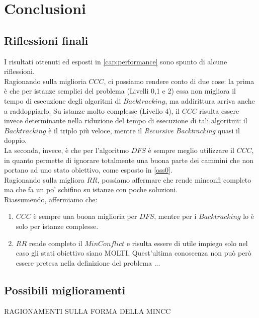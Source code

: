 
\chapter{Conclusioni}
\label{cap:conclusioni}

\section{Riflessioni finali}
I risultati ottenuti ed esposti in \ref{cap:performance} sono spunto di alcune riflessioni.\\

Ragionando sulla miglioria $CCC$, ci possiamo rendere conto di due cose: la prima è che per istanze semplici del problema (Livelli 0,1 e 2) essa non migliora il tempo di esecuzione degli algoritmi di $Backtracking$, ma addirittura arriva anche a raddoppiarlo. Su istanze molto complesse (Livello 4), il $CCC$ risulta essere invece determinante nella riduzione del tempo di esecuzione di tali algoritmi: il $Backtracking$ è il triplo più veloce, mentre il \textit{Recursive Backtracking} quasi il doppio. \\
La seconda, invece, è che per l'algoritmo $DFS$ è sempre meglio utilizzare il $CCC$, in quanto permette di ignorare totalmente una buona parte dei cammini che non portano ad uno stato obiettivo, come esposto in \ref{oss0}.\\

Ragionando sulla migliora $RR$, possiamo affermare che rende minconfl completo ma che fa un po' schifino su istanze con poche soluzioni.\\

Riassumendo, affermiamo che:
\begin{enumerate}
	\item $CCC$ è sempre una buona miglioria per $DFS$, mentre per i $Backtracking$ lo è solo per istanze complesse.
	\item $RR$ rende completo il $MinConflict$ e risulta essere di utile impiego solo nel caso gli stati obiettivo siano MOLTI. Quest'ultima conoscenza non può però essere pretesa nella definizione del problema ... 
\end{enumerate}
\section{Possibili miglioramenti}

RAGIONAMENTI SULLA FORMA DELLA MINCC

